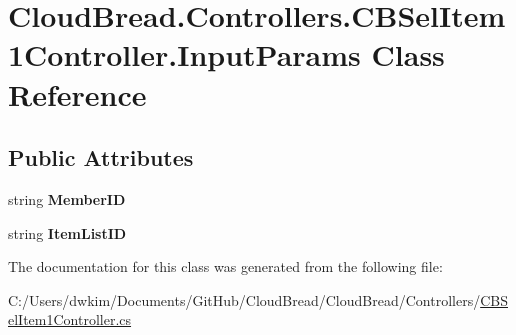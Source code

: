 \hypertarget{a00125}{}\section{Cloud\+Bread.\+Controllers.\+C\+B\+Sel\+Item1\+Controller.\+Input\+Params Class Reference}
\label{a00125}
\subsection*{Public Attributes}
\begin{DoxyCompactItemize}
\item 
string {\bfseries Member\+ID}\hypertarget{a00125_a0112127750f7c6567221c75df29714e3}{}\label{a00125_a0112127750f7c6567221c75df29714e3}

\item 
string {\bfseries Item\+List\+ID}\hypertarget{a00125_ad966be609993d309a0ae9373c4844f26}{}\label{a00125_ad966be609993d309a0ae9373c4844f26}

\end{DoxyCompactItemize}


The documentation for this class was generated from the following file\+:\begin{DoxyCompactItemize}
\item 
C\+:/\+Users/dwkim/\+Documents/\+Git\+Hub/\+Cloud\+Bread/\+Cloud\+Bread/\+Controllers/\hyperlink{a00219}{C\+B\+Sel\+Item1\+Controller.\+cs}\end{DoxyCompactItemize}
